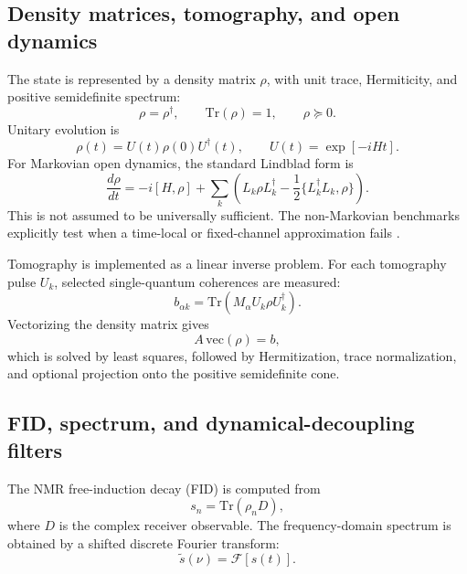 \documentclass[11pt,a4paper]{article}
\begin{document}
\subsection{Density matrices, tomography, and open dynamics}

The state is represented by a density matrix $\rho$, with unit trace,
Hermiticity, and positive semidefinite spectrum:
\begin{equation}
  \rho = \rho^\dagger,\qquad \mathrm{Tr}(\rho)=1,\qquad \rho\succeq0.
\end{equation}
Unitary evolution is
\begin{equation}
  \rho(t) = U(t)\rho(0)U^\dagger(t),
  \qquad U(t)=\exp[-iHt].
\end{equation}
For Markovian open dynamics, the standard Lindblad form is
\begin{equation}
  \frac{d\rho}{dt} =
  -i[H,\rho]
  + \sum_k \left(
    L_k\rho L_k^\dagger
    -\frac{1}{2}\{L_k^\dagger L_k,\rho\}
  \right).
\end{equation}
This is not assumed to be universally sufficient.  The non-Markovian benchmarks
explicitly test when a time-local or fixed-channel approximation fails
\citep{nonmarkov_noise_2022,nonmarkov_process_tensor_2020}.

Tomography is implemented as a linear inverse problem.  For each tomography
pulse $U_k$, selected single-quantum coherences are measured:
\begin{equation}
  b_{\alpha k} =
  \mathrm{Tr}\!\left(M_\alpha U_k\rho U_k^\dagger\right).
\end{equation}
Vectorizing the density matrix gives
\begin{equation}
  A\,\mathrm{vec}(\rho)=b,
\end{equation}
which is solved by least squares, followed by Hermitization, trace
normalization, and optional projection onto the positive semidefinite cone.

\subsection{FID, spectrum, and dynamical-decoupling filters}

The NMR free-induction decay (FID) is computed from
\begin{equation}
  s_n = \mathrm{Tr}(\rho_n D),
\end{equation}
where $D$ is the complex receiver observable.  The frequency-domain spectrum is
obtained by a shifted discrete Fourier transform:
\begin{equation}
  \tilde{s}(\nu)=\mathcal{F}[s(t)].
\end{equation}
\end{document}
